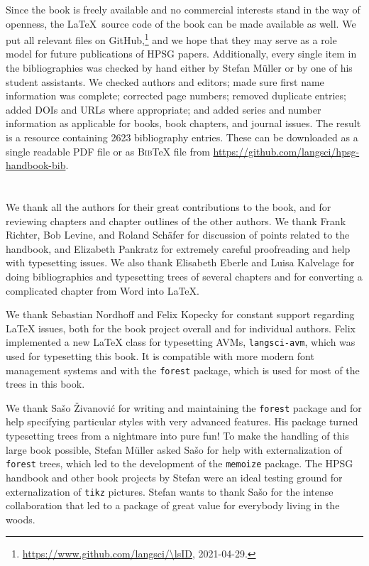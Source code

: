 \begin{refsection}
Since the book is freely available and no commercial interests stand in the way of openness, the \LaTeX\ source code of the book can be made available as well.
We put all relevant files on GitHub,\footnote{
\url{https://www.github.com/langsci/\lsID}, 2021-04-29.
} and we hope that they may serve as a role model for future publications of HPSG papers.
Additionally, every single item in the bibliographies was checked by hand either by Stefan Müller or by one of his student assistants. 
We checked authors and editors; made sure first name information was complete; corrected page numbers; removed duplicate entries; added DOIs and URLs where appropriate; and added series and number information as applicable for books, book chapters, and journal issues.
The result is a resource containing 2623 bibliography entries.
These can be downloaded as a single readable PDF file or as \textsc{Bib}\TeX{} file from \url{https://github.com/langsci/hpsg-handbook-bib}.

\section*{\acknowledgmentsUS}

We thank all the authors for their great contributions to the book, and for
reviewing chapters and chapter outlines of the other authors. We thank
Frank Richter, Bob Levine, and Roland Schäfer for discussion of points related to the handbook, and
Elizabeth Pankratz for extremely careful proofreading and help with typesetting issues. We also
thank Elisabeth Eberle and Luisa Kalvelage for doing bibliographies and typesetting trees of several
chapters and for converting a complicated chapter from Word into \LaTeX.

We thank Sebastian Nordhoff and Felix Kopecky for constant support regarding \LaTeX{} issues, both for
the book project overall and for individual authors. Felix implemented a new \LaTeX{} class for
typesetting AVMs, \texttt{langsci-avm}, which was used for typesetting this book. It is compatible with more
modern font management systems and with the \texttt{forest} package, which is used for most of the trees in this book.

We thank Sašo Živanović for writing and maintaining the \texttt{forest} package and for help
specifying particular styles with very advanced features. His package turned typesetting trees from a
nightmare into pure fun! To make the handling of this large book possible, Stefan Müller asked Sašo
for help with externalization of \texttt{forest} trees, which led to the development of
the \texttt{memoize} package. The HPSG handbook and other book projects by Stefan were an
ideal testing ground for externalization of \texttt{tikz} pictures. Stefan wants to thank
Sašo for the intense collaboration that led to a package of great value for everybody
living in the woods.


\end{refsection}
